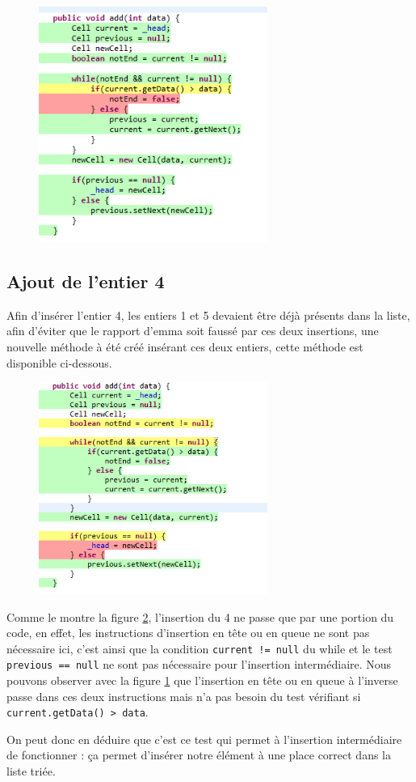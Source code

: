 \documentclass[a4paper, 11pt]{article}
\begin{document}
	\begin{figure}[H]
		\centering
		\includegraphics[width=7.5cm]{screens/ajout1-5.png}
		\label{fig:1erEntiers}
	\end{figure}

	\subsection{Ajout de l'entier 4}
	Afin d'insérer l'entier 4, les entiers 1 et 5 devaient être déjà présents dans la liste, afin
	d'éviter que le rapport d'emma soit faussé par ces deux insertions, une nouvelle méthode à été créé insérant ces deux entiers, cette méthode est
	disponible ci-dessous.

	\begin{figure}[H]
		\centering
		\includegraphics[width=7.5cm]{screens/ajout4.png}
		\label{fig:entier4}
	\end{figure}
	
	Comme le montre la figure \ref{fig:entier4}, l'insertion du 4 ne passe que par une portion du code, en effet, les instructions d'insertion en tête
	ou en queue ne sont pas nécessaire ici, c'est ainsi que la condition \texttt{current != null} du while et le test \texttt{previous == null} ne sont
	pas nécessaire pour l'insertion intermédiaire. Nous pouvons observer avec la figure \ref{fig:1erEntiers} que l'insertion en tête ou en queue à
	l'inverse passe dans ces deux instructions mais n'a pas besoin du test vérifiant si \texttt{current.getData() > data}.

	On peut donc en déduire que c'est ce test qui permet à l'insertion intermédiaire de fonctionner : ça permet d'insérer notre élément à une place
	correct dans la liste triée.
\end{document}

